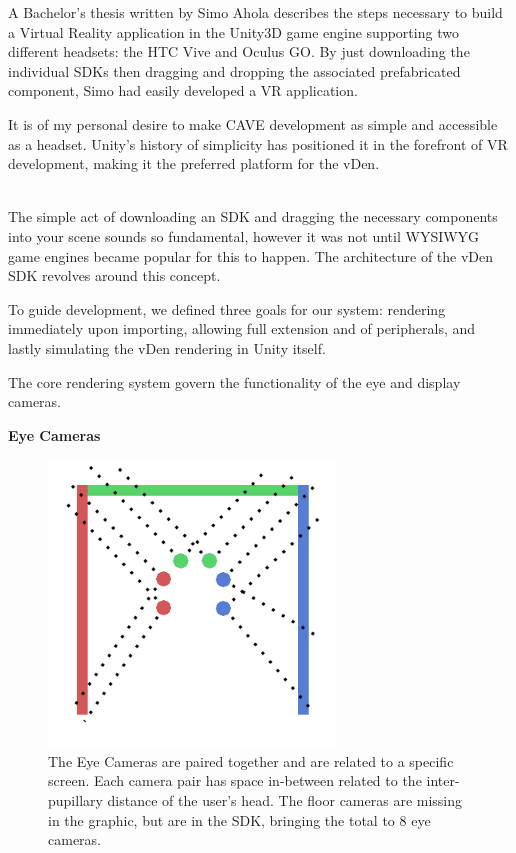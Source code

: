 A Bachelor's thesis written by Simo Ahola describes the steps necessary to build a Virtual Reality application in the Unity3D game engine supporting two different headsets: the HTC Vive and Oculus GO. By just downloading the individual SDKs then dragging and dropping the associated prefabricated component, Simo had easily developed a VR application.\cite{aholaUnityVR} 

It is of my personal desire to make CAVE development as simple and accessible as a headset. Unity's history of simplicity has positioned it in the forefront of VR development, making it the preferred platform for the vDen. 


\filbreak
{}\label{sec:unitySDKSection} \\

The simple act of downloading an SDK and dragging the necessary components into your scene sounds so fundamental, however it was not until WYSIWYG game engines became popular for this to happen. The architecture of the vDen SDK revolves around this concept.

To guide development, we defined three goals for our system: rendering immediately upon importing, allowing full extension and of peripherals, and lastly simulating the vDen rendering in Unity itself.

The core rendering system govern the functionality of the eye and display cameras.

\noindent\textbf{Eye Cameras} \\

\begin{figure}[H]
	\centering
	\includegraphics[width=3in]{images/camera-pairs}
	\caption[The Pairing of Eye Cameras]{The Eye Cameras are paired together and are related to a specific screen. Each camera pair has space in-between related to the inter-pupillary distance of the user's head. The floor cameras are missing in the graphic, but are in the SDK, bringing the total to 8 eye cameras.}
	\label{fig:eye-camera-pairing}
\end{figure}

